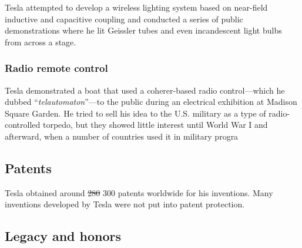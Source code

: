\documentclass[
]{article}
\begin{document}
Tesla attempted to develop a wireless lighting system based on
near-field inductive and capacitive coupling and conducted a series of
public demonstrations where he lit Geissler tubes and even incandescent
light bulbs from across a stage.

\hypertarget{radio-remote-control}{%
\subsubsection{Radio remote control}\label{radio-remote-control}}

Tesla demonstrated a boat that used a coherer-based radio
control---which he dubbed ``\emph{telautomaton}''---to the public during
an electrical exhibition at Madison Square Garden. He tried to sell his
idea to the U.S. military as a type of radio-controlled torpedo, but
they showed little interest until World War I and afterward, when a
number of countries used it in military progra

\hypertarget{patents}{%
\subsection{Patents}\label{patents}}

Tesla obtained around \sout{280} 300 patents worldwide for his
inventions. Many inventions developed by Tesla were not put into patent
protection.

\hypertarget{legacy-and-honors}{%
\subsection{Legacy and honors}\label{legacy-and-honors}}
\end{document}
